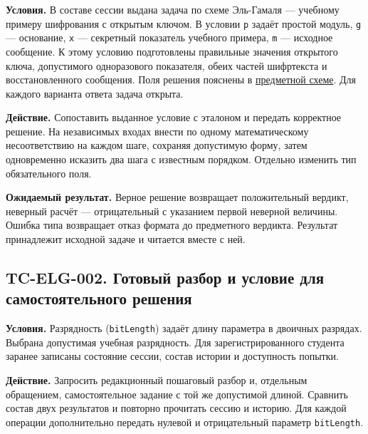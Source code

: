\documentclass[12pt,a4paper]{article}
\begin{document}
\hypertarget{tc-elg-001-генерация-условия-и-проверка-решения}{}

\hypertarget{tc-elg-001}{}

\textbf{Условия.} В составе сессии выдана задача по схеме Эль-Гамаля --- учебному примеру шифрования с открытым ключом. В условии \texttt{p} задаёт простой модуль, \texttt{g} --- основание, \texttt{x} --- секретный показатель учебного примера, \texttt{m} --- исходное сообщение. К этому условию подготовлены правильные значения открытого ключа, допустимого одноразового показателя, обеих частей шифртекста и восстановленного сообщения. Поля решения пояснены в {\href{../07\_Программные\_требования/DOC-06.2\_Сессии\_задач\_и\_планировщик.pdf\#эль-гамаль}{предметной схеме}}. Для каждого варианта ответа задача открыта.

\textbf{Действие.} Сопоставить выданное условие с эталоном и передать корректное решение. На независимых входах внести по одному математическому несоответствию на каждом шаге, сохраняя допустимую форму, затем одновременно исказить два шага с известным порядком. Отдельно изменить тип обязательного поля.

\textbf{Ожидаемый результат.} Верное решение возвращает положительный вердикт, неверный расчёт --- отрицательный с указанием первой неверной величины. Ошибка типа возвращает отказ формата до предметного вердикта. Результат принадлежит исходной задаче и читается вместе с ней.

\subsection{TC-ELG-002. Готовый разбор и условие для самостоятельного решения}\label{tc-elg-002-ux433ux43eux442ux43eux432ux44bux439-ux440ux430ux437ux431ux43eux440-ux438-ux443ux441ux43bux43eux432ux438ux435-ux434ux43bux44f-ux441ux430ux43cux43eux441ux442ux43eux44fux442ux435ux43bux44cux43dux43eux433ux43e-ux440ux435ux448ux435ux43dux438ux44f}

\hypertarget{tc-elg-002-готовый-разбор-и-условие-для-самостоятельного-решения}{}

\hypertarget{tc-elg-002}{}

\textbf{Условия.} Разрядность (\texttt{bitLength}) задаёт длину параметра в двоичных разрядах. Выбрана допустимая учебная разрядность. Для зарегистрированного студента заранее записаны состояние сессии, состав истории и доступность попытки.

\textbf{Действие.} Запросить редакционный пошаговый разбор и, отдельным обращением, самостоятельное задание с той же допустимой длиной. Сравнить состав двух результатов и повторно прочитать сессию и историю. Для каждой операции дополнительно передать нулевой и отрицательный параметр \texttt{bitLength}.
\end{document}
